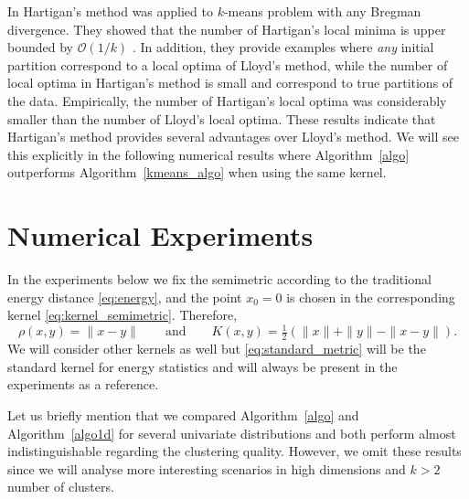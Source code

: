 \documentclass[aps,preprint,nofootinbib,floatfix]{revtex4-1}
\newcommand\kk{K}
\begin{document}
In \cite{Slonin} Hartigan's method was applied to $k$-means problem
with any Bregman divergence. They showed that the number of Hartigan's
local minima is upper bounded by $\mathcal{O}(1/k)$ 
\cite[Proposition 5.1]{Slonin}. 
In addition, they provide examples where
\emph{any} initial partition correspond to a local optima of Lloyd's 
method, while  the number of local optima in Hartigan's method is small and 
correspond to true partitions of the data. Empirically, the number of
Hartigan's local optima was considerably smaller than the number of Lloyd's
local optima.
These results indicate that Hartigan's method
provides several advantages over Lloyd's method. 
We will see this explicitly in the following 
numerical results where Algorithm~\ref{algo}
outperforms Algorithm~\ref{kmeans_algo} when using the same kernel.


\section{Numerical Experiments}
\label{sec:numerics}

In the experiments below we fix the semimetric 
according to the traditional energy distance \eqref{eq:energy}, and
the point $x_0=0$ is chosen in the corresponding kernel  
\eqref{eq:kernel_semimetric}. Therefore,
\begin{equation}
\label{eq:standard_metric}
\rho(x,y) = \| x-y\| \qquad \mbox{and} \qquad \kk(x,y) = 
\tfrac{1}{2}\left( \| x \| + \| y \| - \| x-y \| \right).
\end{equation}
We will consider other kernels as well 
but \eqref{eq:standard_metric} will be the
standard kernel for energy statistics and will always be present in the
experiments as a reference.

Let us briefly mention that we compared Algorithm~\ref{algo} and
Algorithm~\ref{algo1d} for several univariate distributions and
both perform almost indistinguishable regarding the clustering quality.
However, we omit these results since we will analyse more interesting 
scenarios in high dimensions and $k > 2$ number of clusters.
\end{document}
